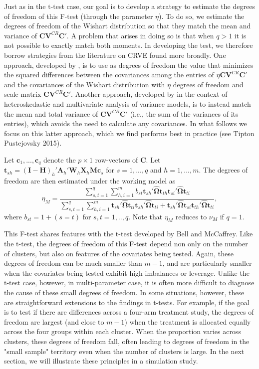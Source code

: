 \documentclass[12pt]{article}\usepackage[]{graphicx}\usepackage[]{color}
\newcommand{\bm}{\mathbf}
\newcommand{\bs}{\boldsymbol}
\begin{document}
Just as in the t-test case, our goal is to develop a strategy to estimate the degrees of freedom of this F-test (through the parameter $\eta$). 
To do so, we estimate the degrees of freedom of the Wishart distribution so that they match the mean and variance of $\bm{C}\bm{V}^{CR} \bm{C}'$. 
A problem that arises in doing so is that when $q > 1$ it is not possible to exactly match both moments. 
In developing the test, we therefore borrow strategies from the literature on CRVE found more broadly. 
One approach, developed by \cite{Pan2002small}, is to use as degrees of freedom the value that minimizes the squared differences between the covariances among the entries of $\eta \bm{C}\bm{V}^{CR}\bm{C}'$ and the covariances of the Wishart distribution with $\eta$ degrees of freedom and scale matrix $\bm{C}\bm{V}^{CR}\bm{C}'$. Another approach, developed by \citet{Zhang2012two-wayANOVA, Zhang2012MANOVA, Zhang2013tests} in the context of heteroskedastic and multivariate analysis of variance models, is to instead match the mean and total variance of $\bm{C}\bm{V}^{CR}\bm{C}'$ (i.e., the sum of the variances of its entries), which avoids the need to calculate any covariances. In what follows we focus on this latter approach, which we find performs best in practice (see Tipton Pustejovsky 2015).

Let $\bm{c}_1,...,\bm{c}_q$ denote the $p \times 1$ row-vectors of $\bm{C}$. 
Let $\bm{t}_{sh} = \left(\bm{I} - \bm{H}\right)_h'\bm{A}_h'\bm{W}_h\bm{X}_h\bm{M}\bm{c}_s$ for $s = 1,...,q$ and $h = 1,...,m$. 
The degrees of freedom are then estimated under the working model as
\begin{equation}
\label{eq:eta_model}
\eta_M = \frac{\sum_{s,t=1}^q \sum_{h,i=1}^m b_{st} \bm{t}_{sh}'\hat{\bs\Omega}\bm{t}_{th} \bm{t}_{si}'\hat{\bs\Omega}\bm{t}_{ti}}{\sum_{s,t=1}^q \sum_{h,i=1}^m \bm{t}_{sh}'\hat{\bs\Omega}\bm{t}_{ti} \bm{t}_{sh}'\hat{\bs\Omega}\bm{t}_{ti} + \bm{t}_{sh}'\hat{\bs\Omega}\bm{t}_{si} \bm{t}_{th}'\hat{\bs\Omega}\bm{t}_{ti}},
\end{equation}
where $b_{st} = 1 + (s=t)$ for $s,t=1,..,q$.
Note that $\eta_M$ reduces to $\nu_M$ if $q = 1$.

This F-test shares features with the t-test developed by Bell and McCaffrey. Like the t-test, the degrees of freedom of this F-test depend non only on the number of clusters, but also on features of the covariates being tested. Again, these degrees of freedom can be much smaller than $m - 1$, and are particularly smaller when the covariates being tested exhibit high imbalances or leverage. Unlike the t-test case, however, in multi-parameter case, it is often more difficult to diagnose the cause of these small degrees of freedom. In some situations, however, these are straightforward extensions to the findings in t-tests. For example, if the goal is to test if there are differences across a four-arm treatment study, the degrees of freedom are largest (and close to $m - 1$) when the treatment is allocated equally across the four groups within each cluster. When the proportion varies across clusters, these degrees of freedom fall, often leading to degrees of freedom in the "small sample" territory even when the number of clusters is large. In the next section, we will illustrate these principles in a simulation study.
\end{document}
